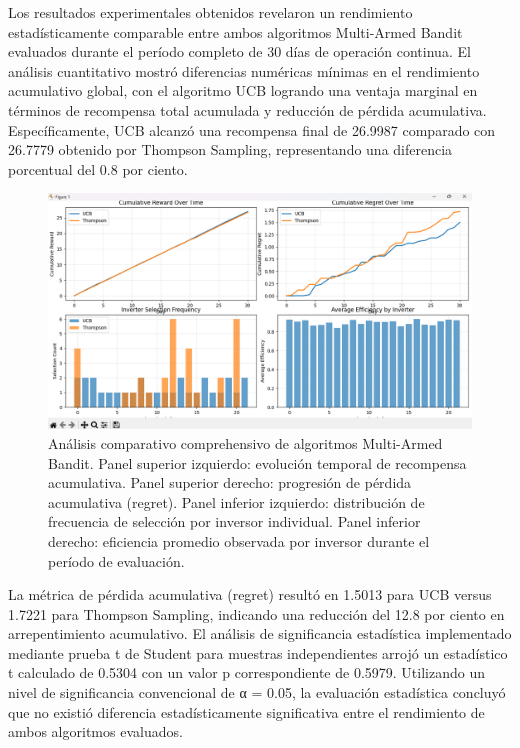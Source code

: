 \documentclass[12pt,a4paper]{article}
\begin{document}
\justify
Los resultados experimentales obtenidos revelaron un rendimiento estadísticamente comparable entre ambos algoritmos Multi-Armed Bandit evaluados durante el período completo de 30 días de operación continua. El análisis cuantitativo mostró diferencias numéricas mínimas en el rendimiento acumulativo global, con el algoritmo UCB logrando una ventaja marginal en términos de recompensa total acumulada y reducción de pérdida acumulativa. Específicamente, UCB alcanzó una recompensa final de 26.9987 comparado con 26.7779 obtenido por Thompson Sampling, representando una diferencia porcentual del 0.8 por ciento.

\begin{figure}[h!]
\centering
\includegraphics[width=\textwidth]{figura1.png}
\caption{Análisis comparativo comprehensivo de algoritmos Multi-Armed Bandit. Panel superior izquierdo: evolución temporal de recompensa acumulativa. Panel superior derecho: progresión de pérdida acumulativa (regret). Panel inferior izquierdo: distribución de frecuencia de selección por inversor individual. Panel inferior derecho: eficiencia promedio observada por inversor durante el período de evaluación.}
\label{fig:results}
\end{figure}

La métrica de pérdida acumulativa (regret) resultó en 1.5013 para UCB versus 1.7221 para Thompson Sampling, indicando una reducción del 12.8 por ciento en arrepentimiento acumulativo. El análisis de significancia estadística implementado mediante prueba t de Student para muestras independientes arrojó un estadístico t calculado de 0.5304 con un valor p correspondiente de 0.5979. Utilizando un nivel de significancia convencional de α = 0.05, la evaluación estadística concluyó que no existió diferencia estadísticamente significativa entre el rendimiento de ambos algoritmos evaluados.
\end{document}
